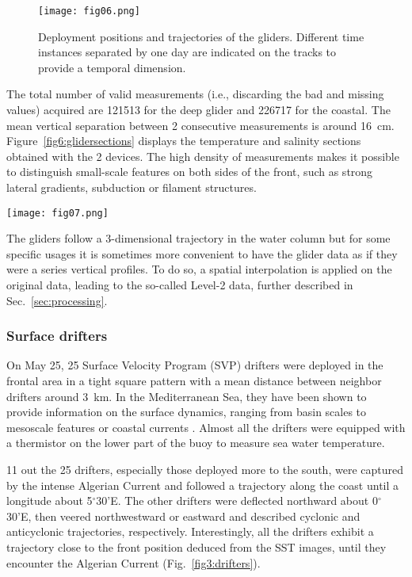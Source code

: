 \documentclass[essd]{copernicus}
\begin{document}
\begin{figure}[t]
\texttt{[image: fig06.png]}
\caption{Deployment positions and trajectories of the gliders. Different time instances separated by one day are indicated on the tracks to provide a temporal dimension.\label{fig6:glidertracks}}
\end{figure}

The total number of valid measurements (i.e., discarding the bad and missing values) acquired are 121513 for the deep glider and 226717 for the coastal. The mean vertical separation between 2 consecutive measurements is around 16~cm. Figure~\ref{fig6:glidersections} displays the temperature and salinity sections obtained with the 2 devices. The high density of measurements makes it possible to distinguish small-scale features on both sides of the front, such as strong lateral gradients, subduction or filament structures.  

\begin{figure*}[t]
\texttt{[image: fig07.png]}
\caption{Temperature (top) and salinity measured by the two gliders. The front position is shown as a dashed, grey line.\label{fig6:glidersections}}
\end{figure*}

The gliders follow a 3-dimensional trajectory in the water column but for some specific usages it is sometimes more convenient to have the glider data as if they were a series vertical profiles. To do so, a spatial interpolation is applied on the original data, leading to the so-called Level-2 data, further described in Sec.~\ref{sec:processing}.


\subsubsection{Surface drifters}

On May 25, 25 Surface Velocity Program (SVP) drifters were deployed in the frontal area in a tight square pattern with a mean distance between neighbor drifters around 3~km. In the Mediterranean Sea, they have been shown to provide information on the surface dynamics, ranging from basin scales to mesoscale features or coastal currents \citep{POULAIN13}. Almost all the drifters were equipped with a thermistor on the lower part of the buoy to measure sea water temperature. 

11 out the 25 drifters, especially those deployed more to the south, were captured by the intense Algerian Current and followed a trajectory along the coast until a longitude about 5$^{\circ}$30'E. The other drifters were deflected northward about 0$^{\circ}$30'E, then veered northwestward or eastward 
and described cyclonic and anticyclonic trajectories, respectively. Interestingly, all the drifters exhibit a trajectory close to the front position deduced from the SST images, until they encounter the Algerian Current (Fig.~\ref{fig3:drifters}). 
\end{document}
